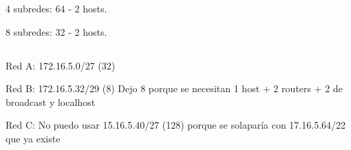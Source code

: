 4 subredes: 64 - 2 hosts.

8 subredes: 32 - 2 hosts.

\subsection{}
\subsubsection{}
Red A: 172.16.5.0/27 (32)

Red B: 172.16.5.32/29 (8) Dejo 8 porque se necesitan 1 host + 2 routers + 2 de broadcast y localhost

Red C: No puedo usar 15.16.5.40/27 (128) porque se solaparía con 17.16.5.64/22 que ya existe

